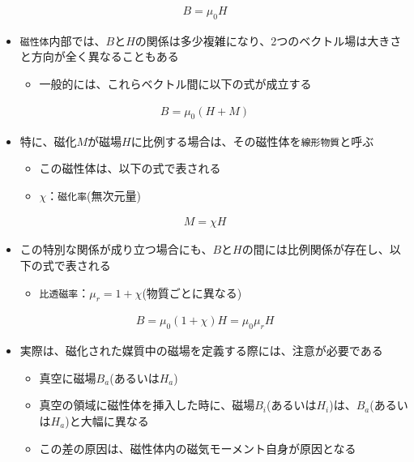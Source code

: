 \documentclass[11pt]{article}
\providecommand{\tightlist}{%
      \setlength{\itemsep}{0pt}\setlength{\parskip}{0pt}}
\begin{document}
\begin{eqnarray}
B = \mu_0 H
\end{eqnarray}

    \begin{itemize}
\item
  \texttt{磁性体}内部では、\(B\)と\(H\)の関係は多少複雑になり、2つのベクトル場は大きさと方向が全く異なることもある

  \begin{itemize}
  \tightlist
  \item
    一般的には、これらベクトル間に以下の式が成立する
  \end{itemize}
\end{itemize}

\begin{eqnarray}
B = \mu_0 (H + M)
\end{eqnarray}

    \begin{itemize}
\item
  特に、磁化\(M\)が磁場\(H\)に比例する場合は、その磁性体を\texttt{線形物質}と呼ぶ

  \begin{itemize}
  \item
    この磁性体は、以下の式で表される
  \item
    \(\chi\)：\texttt{磁化率}(無次元量)
  \end{itemize}
\end{itemize}

\begin{eqnarray}
M = \chi H
\end{eqnarray}

\begin{itemize}
\item
  この特別な関係が成り立つ場合にも、\(B\)と\(H\)の間には比例関係が存在し、以下の式で表される

  \begin{itemize}
  \tightlist
  \item
    \texttt{比透磁率}：\(\mu_r = 1 + \chi\)(物質ごとに異なる)
  \end{itemize}
\end{itemize}

\begin{eqnarray}
B = \mu_0(1 + \chi)H = \mu_0 \mu_r H
\end{eqnarray}

    \begin{itemize}
\item
  実際は、磁化された媒質中の磁場を定義する際には、注意が必要である

  \begin{itemize}
  \item
    真空に磁場\(B_a\)(あるいは\(H_a\))
  \item
    真空の領域に磁性体を挿入した時に、磁場\(B_i\)(あるいは\(H_i\))は、\(B_a\)(あるいは\(H_a\))と大幅に異なる
  \item
    この差の原因は、磁性体内の磁気モーメント自身が原因となる
  \end{itemize}
\end{itemize}
\end{document}
